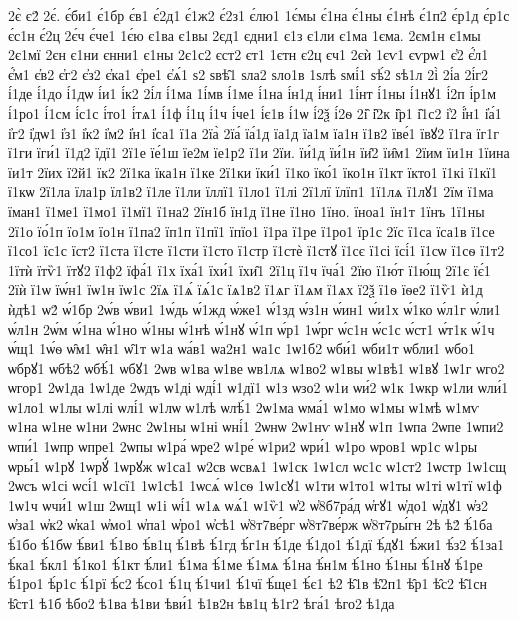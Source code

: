 {2є̀
є2́
2є́.
є́би1
є́1бр
є́в1
є́2д1
є́1ж2
є́2з1
є́лю1
1є́мы
є́1на
є́1ны
є́1нѣ
є́1п2
є́р1д
є́р1с
є́с1н
є́2ц
2є́ч
є́че1
1є́ю
є1ва
є1вы
2єд1
єдни1
є1з
є1ли
є1ма
1єма.
2єм1н
є1мы
2є1мї
2єн
є1ни
єнни1
є1ны
2є1с2
єст2
єт1
1єтн
є2ц
єч1
2єѝ
1єѵ1
єѵрѡ1
є҆2
є҆́л1
є҆́м1
є҆в2
є҆г2
є҆з2
є҆ка1
є҆ре1
є҆ѧ́1
ѕ2
ѕвѣ̑1
ѕла2
ѕло1в
1ѕлѣ
ѕмі́1
ѕѣ́2
ѕѣ1л
2і̀
2і́а
2і́г2
і́1де
і́1до
і́1дѡ
і́и1
і́к2
2і́л
і́1ма
1і́мв
і́1ме
і́1на
і́н1д
і́ни1
1і́нт
і́1ны
і́1нꙋ1
і́2п
і́р1м
і́1ро1
і́1см
і́с1с
і́то1
і́тѧ1
і́1ф
і́1ц
і́1ч
і́че1
і́є1в
і́1ѡ
і́2ѯ
і́2ѳ
2і̑
і̑2к
і̑р1
і̑1с2
і҆2
і҆́н1
і҆а́1
і҆г2
і҆дѡ1
і҆з1
і҆к2
і҆м2
і҆н1
і҆са1
ї1а
2їа̀
2їа́
їа́1д
їа1д
їа1м
їа1н
ї1в2
їве́1
ївꙋ2
ї1га
їг1г
ї1ги
їги́1
ї1д2
їдї1
2ї1е
їе́1ш
їе2м
їе1р2
ї1и
2їи.
їи́1д
їи́1н
їи̑2
їи̑м1
2їим
їи1н
1їина
їи1т
2їих
ї2й1
їк2
2ї1ка
їка1н
ї1ке
2ї1ки
їки́1
ї1ко
їко́1
їко1н
ї1кт
їкто1
ї1кі
ї1кї1
ї1кѡ
2ї1ла
їла1р
їл1в2
ї1ле
ї1ли
їллї1
ї1ло1
ї1лі
2ї1лї
їлїп1
1ї1лѧ
ї1лꙋ1
2їм
ї1ма
їман1
ї1ме1
ї1мо1
ї1мї1
ї1на2
2їн1б
їн1д
ї1не
ї1но
1їно.
їноа1
їн1т
1їнъ
1ї1ны
2ї1о
їо́1п
їо1м
їо1н
ї1па2
їп1п
ї1пї1
їпїо1
ї1ра
ї1ре
ї1ро1
їр1с
2їс
ї1са
їса1в
ї1се
ї1со1
їс1с
їст2
ї1ста
ї1сте
ї1сти
ї1сто
ї1стр
ї1стѐ
ї1стꙋ
ї1сє
ї1сі
їсі́1
ї1сѡ
ї1сѳ
ї1т2
1їтѝ
їтѷ1
їтꙋ2
ї1ф2
їфа́1
ї1х
їха́1
їхи́1
їхи̑1
2ї1ц
ї1ч
їча́1
2їю
ї1ю́т
ї1ю́щ
2ї1є
їє́1
2їѝ
ї1ѡ
їѡ́н1
їѡ1н
їѡ1с
2їѧ
ї1ѧ́
їѧ́1с
їѧ1в2
ї1ѧг
ї1ѧм
ї1ѧх
ї2ѯ
ї1ѳ
їѳе2
ї1ѷ1
ѝ1д
ѝдѣ1
ѡ2́
ѡ́1бр
2ѡ́в
ѡ́ви1
1ѡ́дь
ѡ́1жд
ѡ́же1
ѡ́1зд
ѡ́з1н
ѡ́ин1
ѡ́и1х
ѡ́1ко
ѡ́л1г
ѡ́ли1
ѡ́л1н
2ѡ́м
ѡ́1на
ѡ́1но
ѡ́1ны
ѡ́1нѣ
ѡ́1нꙋ
ѡ́1п
ѡ́р1
1ѡ́рг
ѡ́с1н
ѡ́с1с
ѡ́ст1
ѡ́т1к
ѡ́1ч
ѡ́щ1
1ѡ́ѳ
ѡ̑м1
ѡ̑н1
ѡ̑1т
ѡ1а
ѡа́в1
ѡа2н1
ѡа1с
1ѡ1б2
ѡби́1
ѡби1т
ѡбли1
ѡбо1
ѡбрꙋ1
ѡбѣ2
ѡбѣ́1
ѡбꙋ1
2ѡв
ѡ1ва
ѡ1ве
ѡв1лѧ
ѡ1во2
ѡ1вы
ѡ1вѣ1
ѡ1вꙋ
1ѡ1г
ѡго2
ѡгор1
2ѡ1да
1ѡ1де
2ѡдъ
ѡ1ді
ѡді́1
ѡ1дї1
ѡ1з
ѡзо2
ѡ1и
ѡи́2
ѡ1к
1ѡкр
ѡ1ли
ѡли́1
ѡ1ло1
ѡ1лы
ѡ1лі
ѡлі́1
ѡ1лѡ
ѡ1лѣ
ѡлѣ́1
2ѡ1ма
ѡма́1
ѡ1мо
ѡ1мы
ѡ1мѣ
ѡ1мѵ
ѡ1на
ѡ1не
ѡ1ни
2ѡнс
2ѡ1ны
ѡ1ні
ѡні́1
2ѡнѡ
2ѡ1нѵ
ѡ1нꙋ
ѡ1п
1ѡпа
2ѡпе
1ѡпи2
ѡпи́1
1ѡпр
ѡпре1
2ѡпы
ѡ1ра́
ѡре2
ѡ1ре́
ѡ1ри2
ѡри́1
ѡ1ро
ѡров1
ѡр1с
ѡ1ры
ѡры́1
ѡ1рꙋ
1ѡрꙋ́
1ѡрꙋж
ѡ1са1
ѡ2св
ѡсвѧ1
1ѡ1ск
1ѡ1сл
ѡс1с
ѡ1ст2
1ѡстр
1ѡ1сщ
2ѡсъ
ѡ1сі
ѡсі́1
ѡ1сї1
1ѡ1сѣ1
1ѡсѧ́
ѡ1сѳ
1ѡ1сꙋ1
ѡ1ти
ѡ1то1
ѡ1ты
ѡ1ті
ѡ1тї
ѡ1ф
1ѡ1ч
ѡчи́1
ѡ1ш
2ѡщ1
ѡ1і
ѡі́1
ѡ1ѧ
ѡѧ́1
ѡ1ѷ1
ѡ҆2
ѡ҆8б7ра́д
ѡ҆гꙋ1
ѡ҆до1
ѡ҆дꙋ1
ѡ҆з2
ѡ҆за1
ѡ҆к2
ѡ҆ка1
ѡ҆мо1
ѡ҆па1
ѡ҆ро1
ѡ҆сѣ1
ѡ҆8т7ве́рг
ѡ҆8т7ве́рж
ѡ҆8т7ры́гн
2ѣ
ѣ2́
ѣ́1ба
ѣ́1бо
ѣ́1бѡ
ѣ́ви1
ѣ́1во
ѣ́в1ц
ѣ́1вѣ
ѣ́1гд
ѣ́г1н
ѣ́1де
ѣ́1до1
ѣ́1дї
ѣ́дꙋ1
ѣ́жи1
ѣ́з2
ѣ́1за1
ѣ́ка1
ѣ́кл1
ѣ́1ко1
ѣ́1кт
ѣ́ли1
ѣ́1ма
ѣ́1ме
ѣ́1мѧ
ѣ́1на
ѣ́н1м
ѣ́1но
ѣ́1ны
ѣ́1нꙋ
ѣ́1ре
ѣ́1ро1
ѣ́р1с
ѣ́1рї
ѣ́с2
ѣ́со1
ѣ́1ц
ѣ́1чи1
ѣ́1чї
ѣ́ще1
ѣ́є1
ѣ2̑
ѣ̑1в
ѣ̑2п1
ѣ̑р1
ѣ̑с2
ѣ̑1сн
ѣ̑ст1
ѣ1б
ѣбо2
ѣ1ва
ѣ1ви
ѣви́1
ѣ1в2н
ѣв1ц
ѣ1г2
ѣга́1
ѣго2
ѣ1да
}
